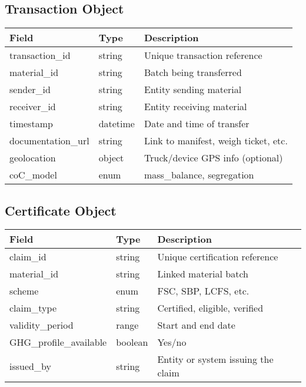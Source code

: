\documentclass{article}
\begin{document}
\subsection*{Transaction Object}
\begin{longtable}{|p{3cm}|p{3cm}|p{8cm}|}
\hline
\textbf{Field} & \textbf{Type} & \textbf{Description} \\
\hline
transaction\_id & string & Unique transaction reference \\
material\_id & string & Batch being transferred \\
sender\_id & string & Entity sending material \\
receiver\_id & string & Entity receiving material \\
timestamp & datetime & Date and time of transfer \\
documentation\_url & string & Link to manifest, weigh ticket, etc. \\
geolocation & object & Truck/device GPS info (optional) \\
coC\_model & enum & mass\_balance, segregation \\
\hline
\end{longtable}

\subsection*{Certificate Object}
\begin{longtable}{|p{3cm}|p{3cm}|p{8cm}|}
\hline
\textbf{Field} & \textbf{Type} & \textbf{Description} \\
\hline
claim\_id & string & Unique certification reference \\
material\_id & string & Linked material batch \\
scheme & enum & FSC, SBP, LCFS, etc. \\
claim\_type & string & Certified, eligible, verified \\
validity\_period & range & Start and end date \\
GHG\_profile\_available & boolean & Yes/no \\
issued\_by & string & Entity or system issuing the claim \\
\hline
\end{longtable}
\end{document}
